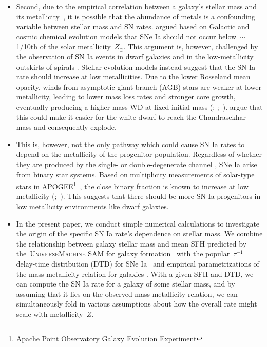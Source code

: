 \documentclass[ms.tex]{subfiles}
\begin{document}
\begin{itemize}
	\item Second, due to the empirical correlation between a galaxy's stellar
	mass and its metallicity~\citep{Tremonti2004, Gallazzi2005, Kirby2013}, it
	is possible that the abundance of metals is a confounding variable between
	stellar mass and SN rates.
	\citet{Kobayashi1998} argued based on Galactic and cosmic chemical
	evolution models that SNe Ia should not occur below~$\sim$1/10th of the
	solar metallicity~$Z_\odot$.
	This argument is, however, challenged by the observation of SN Ia events in
	dwarf galaxies and in the low-metallicity outskirts of spirals
	\citep[e.g.][]{Prieto2008}.
	Stellar evolution models instead suggest that the SN Ia rate should
	increase at low metallicities.
	Due to the lower Rosseland mean opacity, winds from asymptotic giant branch
	(AGB) stars are weaker at lower metallicity, leading to lower mass loss
	rates and stronger core growth, eventually producing a higher mass WD at
	fixed initial mass (\citealp{Umeda1999, Willson2000, Marigo2007};
	\citealp*{Meng2008};~\citealp{Zhao2012, Kalirai2014}).
	\citet{Kistler2013} argue that this could make it easier for the white
	dwarf to reach the Chandrasekhar mass and consequently explode.

	\item This is, however, not the only pathway which could cause SN Ia rates
	to depend on the metallicity of the progenitor population.
	Regardless of whether they are produced by the single-
	\citep[e.g.][]{Whelan1973} or double-degenerate channel
	\citep[e.g.][]{Iben1984, Webbink1984}, SNe Ia arise from binary star
	systems.
	Based on multiplicity measurements of solar-type stars in APOGEE\footnote{
		Apache Point Observatory Galaxy Evolution Experiment
	}~\citep{Majewski2017}, the close binary fraction is known to increase
	at low metallicity (\citealp{Badenes2018};~\citealp*{Moe2019}).
	This suggests that there should be more SN Ia progenitors in low
	metallicity environments like dwarf galaxies.

	\item In the present paper, we conduct simple numerical calculations to
	investigate the origin of the specific SN Ia rate's dependence on stellar
	mass.
	We combine the relationship between galaxy stellar mass and mean SFH
	predicted by the~\textsc{UniverseMachine} SAM for galaxy
	formation~\citep{Behroozi2019} with the popular~$\tau^{-1}$ delay-time
	distribution (DTD) for SNe Ia~\citep[e.g.][]{Maoz2012a} and empirical
	parametrizations of the mass-metallicity relation for galaxies
	\citep{Andrews2013, Zahid2014}.
	With a given SFH and DTD, we can compute the SN Ia rate for a galaxy of
	some stellar mass, and by assuming that it lies on the observed
	mass-metallicity relation, we can simultaneously fold in various
	assumptions about how the overall rate might scale with metallicity~$Z$.

\end{itemize}
\end{document}
